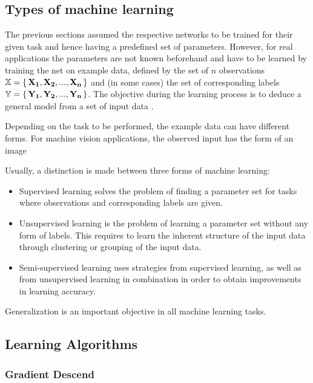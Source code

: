 	
	\subsection { Types of machine learning }

		The previous sections assumed the respective networks to be trained for their given task and hence having a predefined set of parameters. However, for real applications the parameters are not known beforehand and have to be learned by training the net on example data, defined by the set of $n$ observations $\mathbb{X} = \set{\mathbf{X_1},\mathbf{ X_2}, ..., \mathbf{X_n}}$ and (in some cases) the set of corresponding labels $\mathbb{Y} = \set{\mathbf{Y_1},\mathbf{Y_2}, ..., \mathbf{Y_n}}$. The objective during the learning process is to deduce a general model from a set of input data \cite{Bishop2009}. 
	
		
		Depending on the task to be performed, the example data can have different forms. For machine vision applications, the observed input has the form of an image
		
		Usually, a distinction is made between three forms of machine learning:
		
		\begin{itemize}
			\item Supervised learning solves the problem of finding a parameter set for tasks where observations and corresponding labels are given. 
			
			\item Unsupervised learning is the problem of learning a parameter set without any form of labels. This requires to learn the inherent structure of the input data through clustering or grouping of the input data.
			
			\item Semi-supervised learning uses strategies from supervised learning, as well as from unsupervised learning in combination in order to obtain improvements in learning accuracy. 
			

		\end{itemize}
	
		Generalization is an important objective in all machine learning tasks. 
		
		\subsection{Learning Algorithms}

		\subsubsection{Gradient Descend}
		\label{sec:gradient-descend}
		
